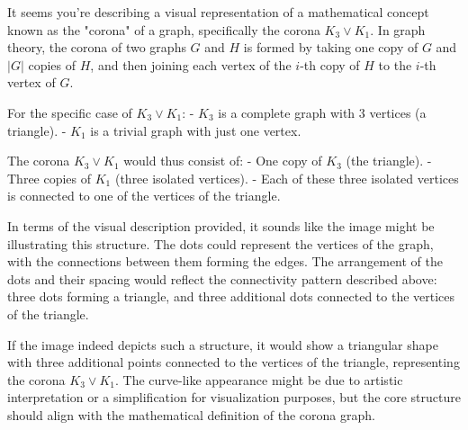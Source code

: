It seems you're describing a visual representation of a mathematical concept known as the "corona" of a graph, specifically the corona \(K_3 \vee K_1\). In graph theory, the corona of two graphs \(G\) and \(H\) is formed by taking one copy of \(G\) and \(|G|\) copies of \(H\), and then joining each vertex of the \(i\)-th copy of \(H\) to the \(i\)-th vertex of \(G\).

For the specific case of \(K_3 \vee K_1\):
- \(K_3\) is a complete graph with 3 vertices (a triangle).
- \(K_1\) is a trivial graph with just one vertex.

The corona \(K_3 \vee K_1\) would thus consist of:
- One copy of \(K_3\) (the triangle).
- Three copies of \(K_1\) (three isolated vertices).
- Each of these three isolated vertices is connected to one of the vertices of the triangle.

In terms of the visual description provided, it sounds like the image might be illustrating this structure. The dots could represent the vertices of the graph, with the connections between them forming the edges. The arrangement of the dots and their spacing would reflect the connectivity pattern described above: three dots forming a triangle, and three additional dots connected to the vertices of the triangle.

If the image indeed depicts such a structure, it would show a triangular shape with three additional points connected to the vertices of the triangle, representing the corona \(K_3 \vee K_1\). The curve-like appearance might be due to artistic interpretation or a simplification for visualization purposes, but the core structure should align with the mathematical definition of the corona graph.
